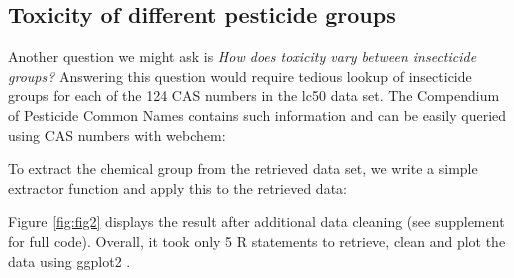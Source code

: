 \subsection[Toxicity of different pesticide groups]{Toxicity of different pesticide groups}
Another question we might ask is \emph{How does toxicity vary between insecticide groups?}
Answering this question would require tedious lookup of insecticide groups for each of the 124 CAS numbers in the lc50 data set.
The Compendium of Pesticide Common Names \citep{wood} contains such information and can be easily queried using CAS numbers with webchem: 

\begin{knitrout}
\begin{kframe}
\begin{alltt}
 \hlkwb{<-} \hlopt{$}  \hlstd{=} \hlstd{)}
\end{alltt}
\end{kframe}
\end{knitrout}

To extract the chemical group from the retrieved data set, we write a simple extractor function and apply this to the retrieved data:

\begin{knitrout}
\end{knitrout}

Figure \ref{fig:fig2} displays the result after additional data cleaning (see supplement for full code).
Overall, it took only 5 R statements to retrieve, clean and plot the data using ggplot2 \citep{ggplot2}.

